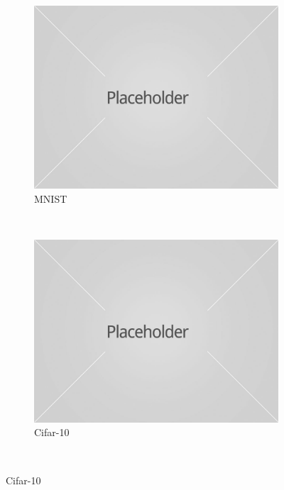 \documentclass{article}
\begin{document}
\begin{figure}
    \centering
    \begin{subfigure}[b]{0.3239\textwidth}
        \includegraphics[width=\textwidth]{placeholder1.jpg}
        \caption{MNIST}
    \end{subfigure}
    ~ %
    \begin{subfigure}[b]{0.3239\textwidth}
        \includegraphics[width=\textwidth]{placeholder1.jpg}
        \caption{Cifar-10}
    \end{subfigure}
    ~ %

\end{figure}
\end{document}
